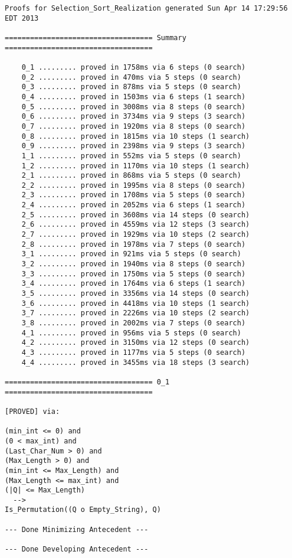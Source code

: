 \begin{lstlisting}[language=resolve]
Proofs for Selection_Sort_Realization generated Sun Apr 14 17:29:56 EDT 2013

=================================== Summary ===================================

	0_1	......... proved in 1758ms via 6 steps (0 search)
	0_2	......... proved in 470ms via 5 steps (0 search)
	0_3	......... proved in 878ms via 5 steps (0 search)
	0_4	......... proved in 1503ms via 6 steps (1 search)
	0_5	......... proved in 3008ms via 8 steps (0 search)
	0_6	......... proved in 3734ms via 9 steps (3 search)
	0_7	......... proved in 1920ms via 8 steps (0 search)
	0_8	......... proved in 1815ms via 10 steps (1 search)
	0_9	......... proved in 2398ms via 9 steps (3 search)
	1_1	......... proved in 552ms via 5 steps (0 search)
	1_2	......... proved in 1170ms via 10 steps (1 search)
	2_1	......... proved in 868ms via 5 steps (0 search)
	2_2	......... proved in 1995ms via 8 steps (0 search)
	2_3	......... proved in 1708ms via 5 steps (0 search)
	2_4	......... proved in 2052ms via 6 steps (1 search)
	2_5	......... proved in 3608ms via 14 steps (0 search)
	2_6	......... proved in 4559ms via 12 steps (3 search)
	2_7	......... proved in 1929ms via 10 steps (2 search)
	2_8	......... proved in 1978ms via 7 steps (0 search)
	3_1	......... proved in 921ms via 5 steps (0 search)
	3_2	......... proved in 1940ms via 8 steps (0 search)
	3_3	......... proved in 1750ms via 5 steps (0 search)
	3_4	......... proved in 1764ms via 6 steps (1 search)
	3_5	......... proved in 3356ms via 14 steps (0 search)
	3_6	......... proved in 4418ms via 10 steps (1 search)
	3_7	......... proved in 2226ms via 10 steps (2 search)
	3_8	......... proved in 2002ms via 7 steps (0 search)
	4_1	......... proved in 956ms via 5 steps (0 search)
	4_2	......... proved in 3150ms via 12 steps (0 search)
	4_3	......... proved in 1177ms via 5 steps (0 search)
	4_4	......... proved in 3455ms via 18 steps (3 search)

=================================== 0_1 ===================================

[PROVED] via:

(min_int <= 0) and
(0 < max_int) and
(Last_Char_Num > 0) and
(Max_Length > 0) and
(min_int <= Max_Length) and
(Max_Length <= max_int) and
(|Q| <= Max_Length)
  -->
Is_Permutation((Q o Empty_String), Q)

--- Done Minimizing Antecedent ---

--- Done Developing Antecedent ---


\end{lstlisting}

